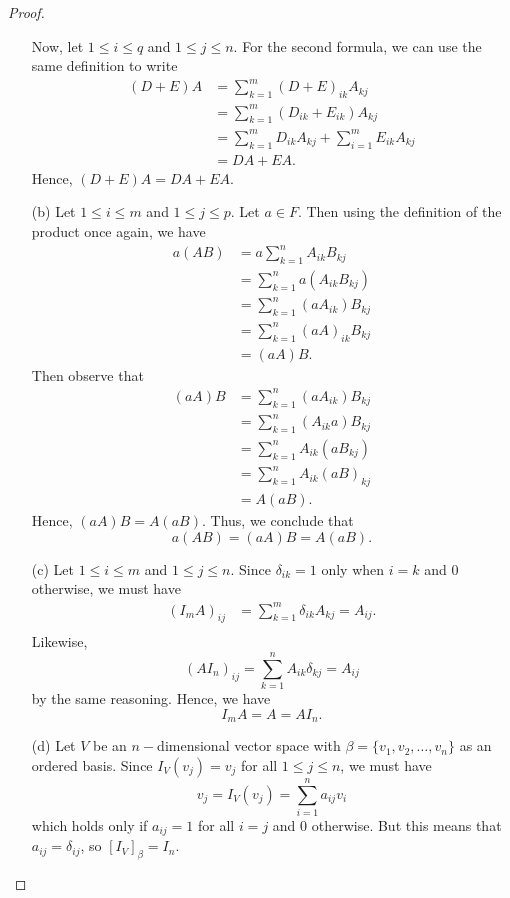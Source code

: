 \begin{proof}
\begin{enumerate}
        Now, let \( 1 \leq i \leq q  \) and \( 1 \leq j \leq n  \). For the second formula, we can use the same definition to write
    \begin{align*}
        (D+E) A &= \sum_{ k=1 }^{ m } {(D+E)}_{ik} {A}_{kj}    \\
                &= \sum_{ k=1 }^{ m } ({D}_{ik } + {E}_{ik }) {A}_{kj} \\
                &= \sum_{ k=1 }^{ m } {D}_{ik} {A}_{kj } + \sum_{ i=1 }^{ m   } {E}_{ik } {A}_{kj} \\
                &= DA + EA.
    \end{align*}
    Hence, \( (D+E) A = DA + EA \).
    \item[(b)] Let \(  1 \leq i \leq m  \) and \( 1 \leq j \leq p  \). Let \( a \in F  \). Then using the definition of the product once again, we have
        \begin{align*}
            a (AB) &= a \sum_{ k=1 }^{ n } {A}_{ik } {B}_{kj} \\
                   &= \sum_{ k=1 }^{ n } a ({A}_{ik } {B}_{kj }) \\
                   &= \sum_{ k=1 }^{ n } ({aA}_{ik}) {B}_{kj } \\
                   &= \sum_{ k=1 }^{ n } {(aA)}_{ik } {B}_{kj} \\
                   &= (aA)B.
        \end{align*}
    Then observe that 
    \begin{align*}  
        (aA)B &= \sum_{ k = 1  }^{ n  } (a {A}_{ik } ) {B}_{kj} \\ 
    &= \sum_{ k=1 }^{ n } ({A}_{ik } a ) {B}_{kj}  \\
    &= \sum_{ k=1 }^{ n } {A}_{ik } (a {B}_{kj})  \\
    &= \sum_{ k=1 }^{ n } {A}_{ik } {(aB)}_{kj} \\
    &= A (aB).
    \end{align*}
    Hence, \( (aA)B = A(aB) \). Thus, we conclude that
    \[ a(AB) = (aA)B = A(aB).  \]
\item[(c)] Let \(   1 \leq i \leq m  \) and \(  1 \leq j \leq n  \). Since \( {\delta}_{ik} = 1   \) only when \( i = k  \) and \( 0  \) otherwise, we must have
    \begin{align*}
        ({I}_{m} A)_{ij} &= \sum_{ k=1  }^{ m  } {\delta}_{ik } {A}_{kj}  = {A}_{ij }. \\
    \end{align*}
    Likewise, 
    \[  {(A {I}_{n} )}_{ij } = \sum_{ k= 1  }^{ n  } {A}_{ik } {\delta}_{k j } = {A}_{ij }  \] by the same reasoning. Hence, we have
    \[  {I}_{m} A = A = A {I}_{n}. \]
    \item[(d)] Let \( V  \) be an \( n- \)dimensional vector space with \( \beta = \{ {v}_{1}, {v}_{2}, \dots, {v}_{n} \}  \) as an ordered basis. Since \( {I}_{V}({v}_{j}) = {v}_{j }  \) for all \( 1 \leq j \leq n  \), we must have
        \[  {v}_{j} = {I}_{V}({v}_{j}) = \sum_{ i=1 }^{ n } {a}_{ij} {v}_{i}   \]
        which holds only if \(  {a}_{ij} = 1  \) for all \( i = j  \) and \( 0  \) otherwise. But this means that \( {a}_{ij} = {\delta}_{ij}  \), so \( [{I}_{V}]_{\beta}^{}  = {I}_{n} \).
        

\end{enumerate}
\end{proof}
